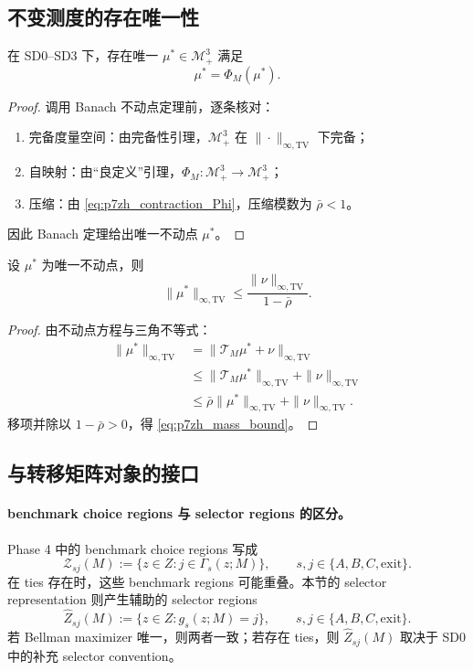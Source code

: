\subsection{不变测度的存在唯一性}

\begin{proposition}[唯一不变测度向量]
在 SD0--SD3 下，存在唯一 $\mu^*\in\mathcal M_+^3$ 满足
\[
\mu^*=\Phi_M(\mu^*).
\]
\end{proposition}

\begin{proof}
调用 Banach 不动点定理前，逐条核对：
\begin{enumerate}
    \item 完备度量空间：由完备性引理，$\mathcal M_+^3$ 在 $\|\cdot\|_{\infty,\mathrm{TV}}$ 下完备；
    \item 自映射：由“良定义”引理，$\Phi_M:\mathcal M_+^3\to\mathcal M_+^3$；
    \item 压缩：由 \eqref{eq:p7zh_contraction_Phi}，压缩模数为 $\bar\rho<1$。
\end{enumerate}
因此 Banach 定理给出唯一不动点 $\mu^*$。
\end{proof}

\begin{proposition}[总质量上界]
设 $\mu^*$ 为唯一不动点，则
\begin{equation}
\|\mu^*\|_{\infty,\mathrm{TV}}
\le\frac{\|\nu\|_{\infty,\mathrm{TV}}}{1-\bar\rho}.
\label{eq:p7zh_mass_bound}
\end{equation}
\end{proposition}

\begin{proof}
由不动点方程与三角不等式：
\begin{align*}
\|\mu^*\|_{\infty,\mathrm{TV}}
&=\|\mathcal T_M\mu^*+\nu\|_{\infty,\mathrm{TV}}\\
&\le\|\mathcal T_M\mu^*\|_{\infty,\mathrm{TV}}+\|\nu\|_{\infty,\mathrm{TV}}\\
&\le\bar\rho\|\mu^*\|_{\infty,\mathrm{TV}}+\|\nu\|_{\infty,\mathrm{TV}}.
\end{align*}
移项并除以 $1-\bar\rho>0$，得 \eqref{eq:p7zh_mass_bound}。
\end{proof}

\subsection{与转移矩阵对象的接口}

\paragraph{benchmark choice regions 与 selector regions 的区分。}
Phase 4 中的 benchmark choice regions 写成
\[
\mathcal Z_{sj}(M):=\{z\in Z:j\in\Gamma_s(z;M)\},
\qquad s,j\in\{A,B,C,\mathrm{exit}\}.
\]
在 ties 存在时，这些 benchmark regions 可能重叠。本节的 selector representation 则产生辅助的 selector regions
\[
\widehat Z_{sj}(M):=\{z\in Z:g_s(z;M)=j\},
\qquad s,j\in\{A,B,C,\mathrm{exit}\}.
\]
若 Bellman maximizer 唯一，则两者一致；若存在 ties，则 $\widehat Z_{sj}(M)$ 取决于 SD0 中的补充 selector convention。

